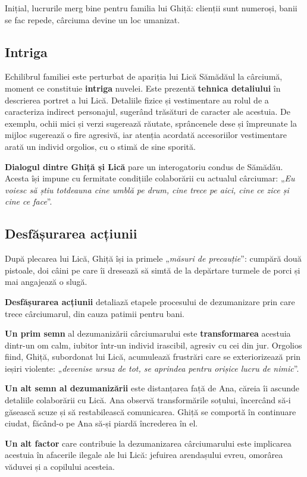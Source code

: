 \documentclass{article}
\newcommand{\qu}[1]{„\emph{#1}”}
\begin{document}
Inițial, lucrurile merg bine pentru familia lui Ghiță: clienții sunt numeroși, banii se fac repede, cârciuma devine un loc umanizat.

\subsection{Intriga}
Echilibrul familiei este perturbat de apariția lui Lică Sămădăul la cârciumă, moment ce constituie \textbf{intriga} nuvelei. Este prezentă \textbf{tehnica detaliului} în descrierea portret a lui Lică. Detaliile fizice și vestimentare au rolul de a caracteriza indirect personajul, sugerând trăsături de caracter ale acestuia. De exemplu, ochii mici și verzi sugerează răutate, sprâncenele dese și împreunate la mijloc sugerează o fire agresivă, iar atenția acordată accesoriilor vestimentare arată un individ orgolios, cu o stimă de sine sporită.

\textbf{Dialogul dintre Ghiță și Lică} pare un interogatoriu condus de Sămădău. Acesta își impune cu fermitate condițiile colaborării cu actualul cârciumar: \qu{Eu voiesc să știu totdeauna cine umblă pe drum, cine trece pe aici, cine ce zice și cine ce face}.

\subsection{Desfășurarea acțiunii}
După plecarea lui Lică, Ghiță își ia primele \qu{măsuri de precauție}: cumpără două pistoale, doi câini pe care îi dresează să simtă de la depărtare turmele de porci și mai angajează o slugă.

\textbf{Desfășurarea acțiunii} detaliază etapele procesului de dezumanizare prin care trece cârciumarul, din cauza patimii pentru bani.

\textbf{Un prim semn} al dezumanizării cârciumarului este \textbf{transformarea} acestuia dintr-un om calm, iubitor într-un individ irascibil, agresiv cu cei din jur. Orgolios fiind, Ghiță, subordonat lui Lică, acumulează frustrări care se exteriorizează prin ieșiri violente: \qu{devenise ursuz de tot, se aprindea pentru orișice lucru de nimic}.

\textbf{Un alt semn al dezumanizării} este distanțarea față de Ana, căreia îi ascunde detaliile colaborării cu Lică. Ana observă transformările soțului, încercând să-i găsească scuze și să restabilească comunicarea. Ghiță se comportă în continuare ciudat, făcând-o pe Ana să-și piardă încrederea în el.

\textbf{Un alt factor} care contribuie la dezumanizarea cârciumarului este implicarea acestuia în afacerile ilegale ale lui Lică: jefuirea arendașului evreu, omorârea văduvei și a copilului acesteia.
\end{document}
